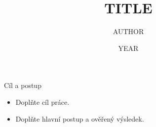 \documentclass[{{CLASS_OPTIONS}},aspect169]{tulpresentation}
\title{{{TITLE}}}
\author{{{AUTHOR}}}
\institute{{{INSTITUTE}}}
\date{{{YEAR}}}
\begin{document}
\TULtitleframe
\begin{frame}{Cíl a postup}
  \begin{itemize}
    \item Doplňte cíl práce.
    \item Doplňte hlavní postup a ověřený výsledek.
  \end{itemize}
\end{frame}
\TULendframe
\end{document}
